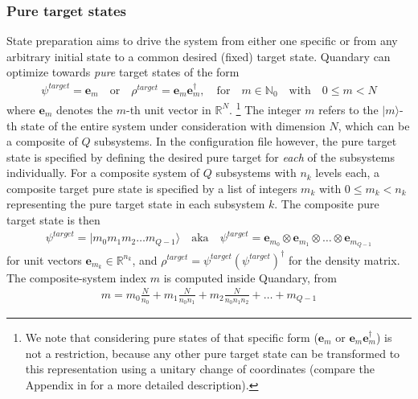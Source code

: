 \documentclass[11pt]{article}
\newcommand{\R}{\mathds{R}}
\newcommand{\N}{\mathds{N}}
\begin{document}
\subsubsection{Pure target states}\label{sec:statepreparation}
State preparation aims to drive the system from either one specific or from any arbitrary initial state to a common desired (fixed) target state. Quandary can optimize towards \textit{pure} target states of the form 
\begin{align}
 \psi^{target} = \boldsymbol{e}_m \quad \text{or} \quad \rho^{target} = \boldsymbol{e}_m \boldsymbol{e}_m^\dagger, \quad \text{for}\quad m\in \N_0\quad \text{with}\quad 0\leq m < N
\end{align}
where $\boldsymbol{e}_m$ denotes the $m$-th unit vector in $\R^N$. 
\footnote{We note that considering pure states of that specific form ($\boldsymbol{e}_m$ or $\boldsymbol{e}_m\boldsymbol{e}_m^\dagger$) is not a restriction, because any other pure target state can be transformed to this representation using a unitary change of coordinates (compare the Appendix in \cite{guenther2021quantum} for a more detailed description).}
The integer $m$ refers to the $|m\rangle$-th state of the entire system under consideration with dimension $N$, which can be a composite of $Q$ subsystems. 
In the configuration file however, the pure target state is specified by defining the desired pure target for \textit{each} of the subsystems individually. For a composite system of $Q$ subsystems with $n_k$ levels each, a composite target pure state is specified by a list of integers $m_k$ with $0\leq m_k < n_k$ representing the pure target state in each subsystem $k$. The composite pure target state is then
\begin{align}
  \psi^{target} = |m_0 m_1 m_2 \dots m_{Q-1} \rangle \quad \text{aka} \quad  \psi^{target} = \boldsymbol{e}_{m_0}\otimes  \boldsymbol{e}_{m_1}\otimes  \dots \otimes\boldsymbol{e}_{m_{Q-1}} 
\end{align}
for unit vectors $\boldsymbol{e}_{m_k} \in \R^{n_k}$, and $\rho^{target} = \psi^{target} (\psi^{target})^\dagger$ for the density matrix. The composite-system index $m$ is computed inside Quandary, from 
\begin{align}
  m = m_0 \frac{N}{n_0} + m_1 \frac{N}{n_0n_1} + m_2 \frac{N}{n_0n_1n_2} + \dots + m_{Q-1}
\end{align}
\end{document}
